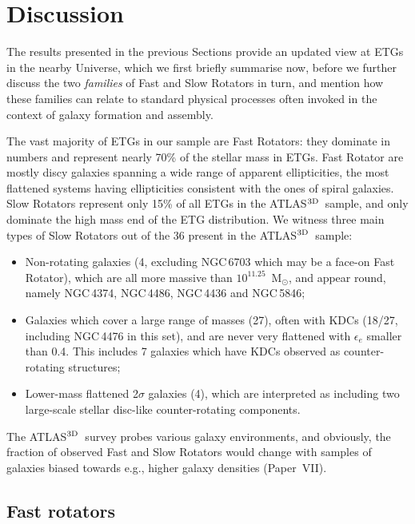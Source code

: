 \documentclass[useAMS,usenatbib,usegraphicx]{mn2e}
\newcommand{\atlas}{{ATLAS$^{\rm 3D}$}}
\begin{document}
\section{Discussion}
\label{sec:discussion}
The results presented in the previous Sections provide an updated view at 
ETGs in the nearby Universe, which we first briefly summarise now, before
we further discuss the two {\em families} of Fast and
Slow Rotators in turn, and mention how these families can relate to
standard physical processes often invoked in the context of galaxy formation and
assembly.

The vast majority of ETGs in our sample are Fast Rotators: they dominate
in numbers and represent nearly 70\% of the stellar mass in ETGs. 
Fast Rotator are mostly discy galaxies spanning a wide range of 
apparent ellipticities, the most flattened systems having ellipticities
consistent with the ones of spiral galaxies. 
Slow Rotators represent only 15\% of all ETGs in the \atlas\ sample, and
only dominate the high mass end of the ETG distribution.
We witness three main types of Slow Rotators out of the 36 present in the \atlas\ sample: 
\begin{itemize}
   \item Non-rotating galaxies (4, excluding NGC\,6703 which may be a face-on Fast Rotator), 
      which are all more massive than $10^{11.25}$~M$_{\odot}$, and appear
      round, namely NGC\,4374, NGC\,4486, NGC\,4436 and NGC\,5846;
   \item Galaxies which cover a large range of masses (27), often with KDCs (18/27, including
      NGC\,4476 in this set), and are never very flattened with $\epsilon_e$ smaller than 0.4. 
      This includes 7 galaxies which have KDCs observed as counter-rotating structures;
   \item Lower-mass flattened 2$\sigma$ galaxies (4), which are interpreted
as including two large-scale stellar disc-like counter-rotating components.
\end{itemize}
The \atlas\ survey probes various galaxy environments, and 
obviously, the fraction of observed Fast and Slow Rotators 
would change with samples of galaxies biased towards e.g.,
higher galaxy densities (Paper~VII).

\subsection{Fast rotators}
\label{sec:MC}
\end{document}
